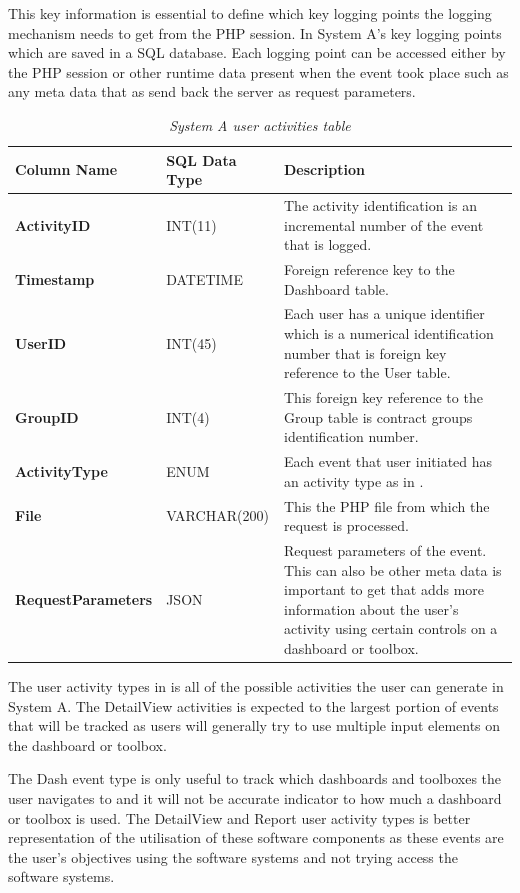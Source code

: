 This key information is essential to define which key logging points the logging mechanism needs to get from the PHP session. In  System A's key logging points which are saved in a SQL database. Each logging point can be accessed either by the PHP session or other runtime data present when the event took place such as any meta data that as send back the server as request parameters.

\begin{table}[!htb]
	\centering
	\small
	\caption[Logging points]
	{\textit{System A user activities table}}
	\label{tbl:Ch2_System_A_Logging_Points}
	\begin{tabularx}{\textwidth}{|l|l|X|}
		\hline \textbf{Column Name} & \textbf{SQL Data Type} & \textbf{Description} \\
		\hline \textbf{ActivityID} & INT(11) & The activity identification is an incremental number of the event that is logged.\\
		\hline \textbf{Timestamp} & DATETIME & Foreign reference key to the Dashboard table.\\
		\hline \textbf{UserID} & INT(45) & Each user has a unique identifier which is a numerical identification number that is foreign key reference to the User table.\\
		\hline \textbf{GroupID} & INT(4) & This foreign key reference to the Group table is contract groups identification number. \\ 		
		\hline \textbf{ActivityType} & ENUM & Each event that user initiated has an activity type as in \Cref{tbl:Ch2_SystemA_EventTypes}. \\
		\hline \textbf{File} & VARCHAR(200) & This the PHP file from which the request is processed.\\
		\hline \textbf{RequestParameters} & JSON & Request parameters of the event. This can also be other meta data is important to get that adds more information about the user's activity using certain controls on a dashboard or toolbox. \\
		\hline
	\end{tabularx}
\end{table}

\clearpage

The user activity types in  is all of the possible activities the user can generate in System A. The DetailView activities is expected to the largest portion of events that will be tracked as users will generally try to use multiple input elements on the dashboard or toolbox. \par The Dash event type is only useful to track which dashboards and toolboxes the user navigates to and it will not be accurate indicator to how much a dashboard or toolbox is used. The DetailView and Report user activity types is better representation of the utilisation of these software components as these events are the user's objectives using the software systems and not trying access the software systems.  

